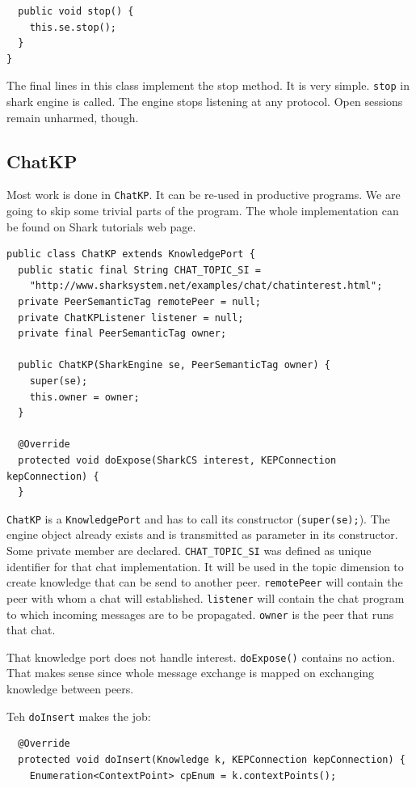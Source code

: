 {\begin{verbatim}
  public void stop() {
    this.se.stop();
  }
}
\end{verbatim}
The final lines in this class implement the stop method. It is very simple. {\tt stop} in shark engine is called. The engine stops listening at any protocol. Open sessions remain unharmed, though.

\subsection{ChatKP}
Most work is done in {\tt ChatKP}. It can be re-used in productive programs.
We are going to skip some trivial parts of the program. The whole implementation can be found on Shark tutorials web page.

\begin{verbatim}
public class ChatKP extends KnowledgePort {
  public static final String CHAT_TOPIC_SI =
    "http://www.sharksystem.net/examples/chat/chatinterest.html";
  private PeerSemanticTag remotePeer = null;
  private ChatKPListener listener = null;
  private final PeerSemanticTag owner;

  public ChatKP(SharkEngine se, PeerSemanticTag owner) {
    super(se);
    this.owner = owner;
  }

  @Override
  protected void doExpose(SharkCS interest, KEPConnection kepConnection) {
  }
\end{verbatim}

{\tt ChatKP} is a {\tt KnowledgePort} and has to call its constructor
({\tt super(se);}). The engine object already exists and is transmitted as
parameter in its constructor. Some private member are declared.
{\tt CHAT\_TOPIC\_SI} was defined as unique identifier for that chat implementation. It will be used in the topic dimension to create knowledge that can be send to another peer. {\tt remotePeer} will contain the peer with whom a chat will established. {\tt listener} will contain the chat program to which incoming messages are to be propagated. {\tt owner} is the peer that runs that chat.

That knowledge port does not handle interest. {\tt doExpose()} contains no action. That makes sense since whole message exchange is mapped on exchanging knowledge between peers.

Teh {\tt doInsert} makes the job:
\begin{verbatim}
  @Override
  protected void doInsert(Knowledge k, KEPConnection kepConnection) {
    Enumeration<ContextPoint> cpEnum = k.contextPoints();


\end{verbatim}}
